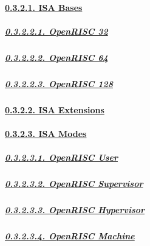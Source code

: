 \documentclass[
]{article}
\begin{document}
\hypertarget{isa-bases-1}{%
\paragraph{\texorpdfstring{\protect\hyperlink{isa-bases-4}{0.3.2.1. ISA
Bases}}{0.3.2.1. ISA Bases}}\label{isa-bases-1}}

\hypertarget{openrisc-32}{%
\subparagraph{\texorpdfstring{\protect\hyperlink{openrisc-32-1}{0.3.2.2.1.
OpenRISC 32}}{0.3.2.2.1. OpenRISC 32}}\label{openrisc-32}}

\hypertarget{openrisc-64}{%
\subparagraph{\texorpdfstring{\protect\hyperlink{openrisc-64-1}{0.3.2.2.2.
OpenRISC 64}}{0.3.2.2.2. OpenRISC 64}}\label{openrisc-64}}

\hypertarget{openrisc-128}{%
\subparagraph{\texorpdfstring{\protect\hyperlink{openrisc-128-1}{0.3.2.2.3.
OpenRISC 128}}{0.3.2.2.3. OpenRISC 128}}\label{openrisc-128}}

\hypertarget{isa-extensions-1}{%
\paragraph{\texorpdfstring{\protect\hyperlink{isa-extensions-4}{0.3.2.2.
ISA Extensions}}{0.3.2.2. ISA Extensions}}\label{isa-extensions-1}}

\hypertarget{isa-modes-1}{%
\paragraph{\texorpdfstring{\protect\hyperlink{isa-modes-4}{0.3.2.3. ISA
Modes}}{0.3.2.3. ISA Modes}}\label{isa-modes-1}}

\hypertarget{openrisc-user}{%
\subparagraph{\texorpdfstring{\protect\hyperlink{openrisc-user-1}{0.3.2.3.1.
OpenRISC User}}{0.3.2.3.1. OpenRISC User}}\label{openrisc-user}}

\hypertarget{openrisc-supervisor}{%
\subparagraph{\texorpdfstring{\protect\hyperlink{openrisc-supervisor-1}{0.3.2.3.2.
OpenRISC
Supervisor}}{0.3.2.3.2. OpenRISC Supervisor}}\label{openrisc-supervisor}}

\hypertarget{openrisc-hypervisor}{%
\subparagraph{\texorpdfstring{\protect\hyperlink{openrisc-hypervisor-1}{0.3.2.3.3.
OpenRISC
Hypervisor}}{0.3.2.3.3. OpenRISC Hypervisor}}\label{openrisc-hypervisor}}

\hypertarget{openrisc-machine}{%
\subparagraph{\texorpdfstring{\protect\hyperlink{openrisc-machine-1}{0.3.2.3.4.
OpenRISC
Machine}}{0.3.2.3.4. OpenRISC Machine}}\label{openrisc-machine}}
\end{document}
